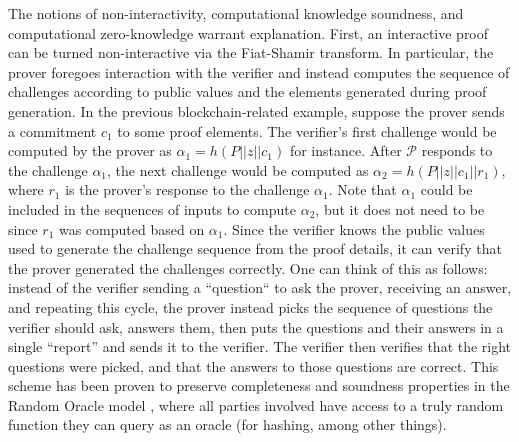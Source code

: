 \noindent The notions of non-interactivity, computational knowledge soundness, and computational zero-knowledge warrant explanation. First, an interactive proof can be turned non-interactive via the Fiat-Shamir transform. In particular, the prover foregoes interaction with the verifier and instead computes the sequence of challenges according to public values and the elements generated during proof generation. In the previous blockchain-related example, suppose the prover sends a commitment $c_1$ to some proof elements. The verifier's first challenge would be computed by the prover as $\alpha_1 = h(P || z || c_1)$ for instance. After $\mathcal{P}$ responds to the challenge $\alpha_1$, the next challenge would be computed as $\alpha_2 = h(P || z || c_1 || r_1)$, where $r_1$ is the prover's response to the challenge $\alpha_1$. Note that $\alpha_1$ could be included in the sequences of inputs to compute $\alpha_2$, but it does not need to be since $r_1$ was computed based on $\alpha_1$. Since the verifier knows the public values used to generate the challenge sequence from the proof details, it can verify that the prover generated the challenges correctly. One can think of this as follows: instead of the verifier sending a ``question`` to ask the prover, receiving an answer, and repeating this cycle, the prover instead picks the sequence of questions the verifier should ask, answers them, then puts the questions and their answers in a single ``report'' and sends it to the verifier. The verifier then verifies that the right questions were picked, and that the answers to those questions are correct. This scheme has been proven to preserve completeness and soundness properties in the Random Oracle model \cite{rom}, where all parties involved have access to a truly random function they can query as an oracle (for hashing, among other things).\\


